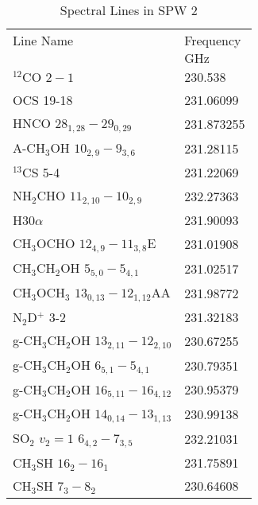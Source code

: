 \begin{table*}[htp]
\caption{Spectral Lines in SPW 2}
\begin{tabular}{ll}
\label{tab:linesspw2}
Line Name & Frequency \\
 & $\mathrm{GHz}$ \\
\hline
$^{12}$CO $2-1$ & 230.538 \\
OCS 19-18 & 231.06099 \\
HNCO $28_{1,28}-29_{0,29}$ & 231.873255 \\
A-CH$_3$OH $10_{2,9}-9_{3,6}$ & 231.28115 \\
$^{13}$CS 5-4 & 231.22069 \\
NH$_2$CHO $11_{2,10}-10_{2,9}$ & 232.27363 \\
H30$\alpha$ & 231.90093 \\
CH$_3$OCHO $12_{4,9}-11_{3,8}$E & 231.01908 \\
CH$_3$CH$_2$OH $5_{5,0}-5_{4,1}$ & 231.02517 \\
CH$_3$OCH$_3$ $13_{0,13}-12_{1,12}$AA & 231.98772 \\
N$_2$D$^+$ 3-2 & 231.32183 \\
g-CH$_3$CH$_2$OH $13_{2,11}-12_{2,10}$ & 230.67255 \\
g-CH$_3$CH$_2$OH $6_{5,1}-5_{4,1}$ & 230.79351 \\
g-CH$_3$CH$_2$OH $16_{5,11}-16_{4,12}$ & 230.95379 \\
g-CH$_3$CH$_2$OH $14_{0,14}-13_{1,13}$ & 230.99138 \\
SO$_2$ $v_2=1$ $6_{4,2}-7_{3,5}$ & 232.21031 \\
CH$_3$SH $16_2-16_1$ & 231.75891 \\
CH$_3$SH $7_3-8_2$ & 230.64608 \\
\hline
\end{tabular}

\end{table*}

